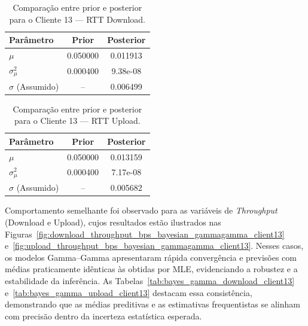 \documentclass{article}
\begin{document}
\begin{table}[htp!]
	\centering
	\caption{Comparação entre prior e posterior para o Cliente 13 — RTT Download.}
	\label{tab:bayes_rtt_download_client13}
	\begin{tabular}{lcc}
		\hline
		\textbf{Parâmetro} & \textbf{Prior} & \textbf{Posterior} \\ \hline
		$\mu$ & 0.050000 & 0.011913 \\
		$\sigma^2_{\mu}$ & 0.000400 & 9.38e-08 \\
		$\sigma$ (Assumido) & -- & 0.006499 \\ \hline
	\end{tabular}
\end{table}

\begin{table}[htp!]
	\centering
	\caption{Comparação entre prior e posterior para o Cliente 13 — RTT Upload.}
	\label{tab:bayes_rtt_upload_client13}
	\begin{tabular}{lcc}
		\hline
		\textbf{Parâmetro} & \textbf{Prior} & \textbf{Posterior} \\ \hline
		$\mu$ & 0.050000 & 0.013159 \\
		$\sigma^2_{\mu}$ & 0.000400 & 7.17e-08 \\
		$\sigma$ (Assumido) & -- & 0.005682 \\ \hline
	\end{tabular}
\end{table}

Comportamento semelhante foi observado para as variáveis de \textit{Throughput} (Download e Upload), cujos resultados estão ilustrados nas Figuras~\ref{fig:download_throughput_bps_bayesian_gammagamma_client13} e~\ref{fig:upload_throughput_bps_bayesian_gammagamma_client13}.
Nesses casos, os modelos Gamma–Gamma apresentaram rápida convergência e previsões com médias praticamente idênticas às obtidas por MLE, evidenciando a robustez e a estabilidade da inferência.
As Tabelas~\ref{tab:bayes_gamma_download_client13} e~\ref{tab:bayes_gamma_upload_client13} destacam essa consistência, demonstrando que as médias preditivas e as estimativas frequentistas se alinham com precisão dentro da incerteza estatística esperada.
\end{document}

